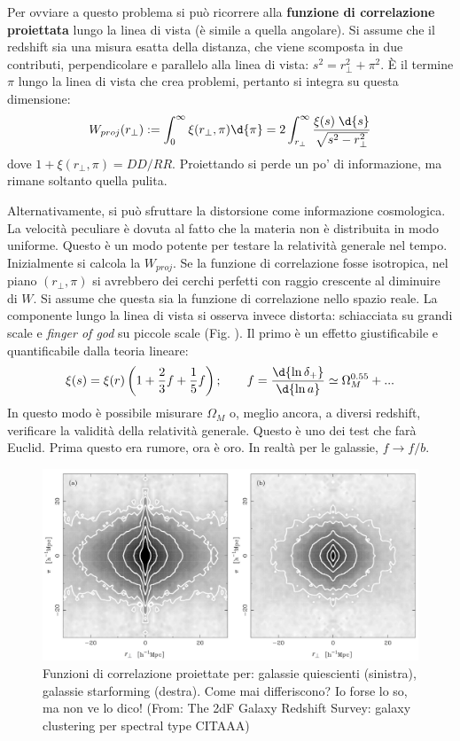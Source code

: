 Per ovviare a questo problema si può ricorrere alla \textbf{funzione di correlazione proiettata} lungo la linea di vista (è simile a quella angolare). Si assume che il redshift sia una misura esatta della distanza, che viene scomposta in due contributi, perpendicolare e parallelo alla linea di vista: $s^2 =  r_\perp^2 + \pi^2$. È il termine $\pi$ lungo la linea di vista che crea problemi, pertanto si integra su questa dimensione:
\begin{equation}
    W_{proj}(r_\perp ):=\int_0^\infty \xi(r_\perp, \pi)\d{\pi}=2\int_{r_\perp}^\infty\frac{\xi(s)\;\d{s}}{\sqrt{s^2-r_\perp ^2}} 
\end{equation}
dove $1+\xi(r_\perp , \pi)= DD/RR$. Proiettando si perde un po' di informazione, ma rimane soltanto quella pulita.

\vspace{1em}
Alternativamente, si può sfruttare la distorsione come informazione cosmologica. La velocità peculiare è dovuta al fatto che la materia non è distribuita in modo uniforme. Questo è un modo potente per testare la relatività generale nel tempo. Inizialmente si calcola la $W_{proj}$. Se la funzione di correlazione fosse isotropica, nel piano $(r_\perp,\pi)$ si avrebbero dei cerchi perfetti con raggio crescente al diminuire di $W$. Si assume che questa sia la funzione di correlazione nello spazio reale. La componente lungo la linea di vista si osserva invece distorta: schiacciata su grandi scale e \textit{finger of god} su piccole scale (Fig. ). Il primo è un effetto giustificabile e quantificabile dalla teoria lineare:
\begin{equation}
    \xi(s)=\xi(r)\left(1+\frac{2}{3}f+\frac{1}{5}f\right);\qquad f=\frac{\d{\ln \delta_+}}{\d{\ln a}}\simeq \Omega_M^{0.55}+...
\end{equation}
In questo modo è possibile misurare $\Omega_M$ o, meglio ancora, a diversi redshift, verificare la validità della relatività generale. Questo è uno dei test che farà Euclid. Prima questo era rumore, ora è oro. In realtà per le galassie, $f\to f/b$.
\begin{figure}[H]
    \centering
    \includegraphics[width=.75 \textwidth]{Pictures/10/apforse.jpg}
    \caption{Funzioni di correlazione proiettate per: galassie quiescienti (sinistra), galassie starforming (destra). Come mai differiscono? Io forse lo so, ma non ve lo dico! (From: The 2dF Galaxy Redshift Survey: galaxy clustering per spectral type CITAAA)}
\end{figure}

